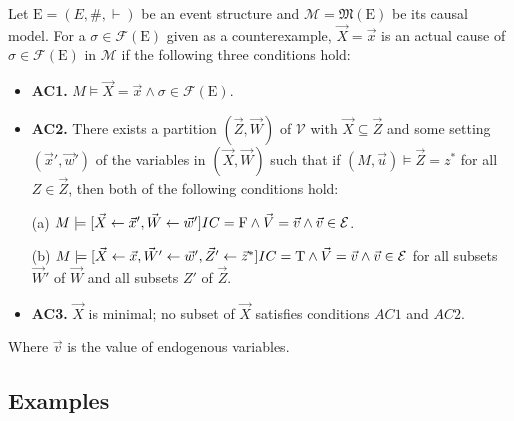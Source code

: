 \begin{definition}
    Let $\mathrm{E} = (E,\#,\vdash)$ be an event structure and
    $\mathcal{M} = \mathfrak{M}(\mathrm{E})$ be its causal model.
    For a $\sigma \in \mathcal{F}(\mathrm{E})$ given as a counterexample,
    $\vec X = \vec x$ is an actual cause of
    $\sigma \in \mathcal{F}(\mathrm{E})$ in $\mathcal{M}$ if the following three conditions hold:
    \begin{itemize}
        \item  \textbf{AC1.} $M\models \vec X = \vec x
                  \wedge \sigma \in \mathcal{F}(\mathrm{E})$.
        \item  \textbf{AC2. }There exists a partition $(\vec Z, \vec W)$ of $\mathcal{V}$ with $\vec X \subseteq \vec Z$ and some setting $(\vec x',\vec w')$ of the variables in $(\vec X,\vec W)$ such that if $(M,\vec u)\models \vec Z = z^*$ for all $Z\in \vec Z$, then both of the following conditions hold:

              (a) $M \models[\vec X \leftarrow \vec x', \vec W \leftarrow \vec w']
                    IC = \mathrm{F}
                  \wedge \vec V = \vec v
                  \wedge  \vec v \in \mathcal{E}$.

              (b) $M \models[\vec X\leftarrow \vec x, \vec W' \leftarrow \vec w', \vec Z'\leftarrow \vec z^*]
                IC = \mathrm{T}
                  \wedge \vec V = \vec v
                  \wedge \vec v \in \mathcal{E}$
              for all subsets $\vec W'$ of $\vec W$ and all subsets $Z'$ of $\vec Z$.

        \item  \textbf{AC3.} $\vec X$ is minimal; no subset of $\vec X$ satisfies conditions $AC1$ and $AC2$.
    \end{itemize}
    Where $\vec v$ is the value of endogenous variables.
\end{definition}
\pagebreak
\subsection{Examples}
